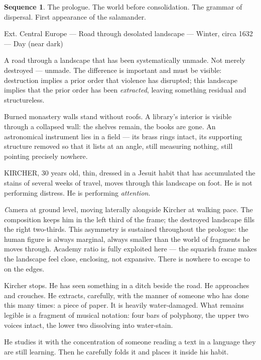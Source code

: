 \documentclass[12pt, a4paper, twoside]{memoir}
\theoremstyle{definition}
\newtheorem{sequence}{Sequence}[chapter]
\theoremstyle{remark}
\newenvironment{sceneheading}{%
  \vspace{8pt}%
  \noindent\begin{mdframed}[
    linecolor=arkgold,
    linewidth=0.8pt,
    leftmargin=0pt,
    rightmargin=0pt,
    innerleftmargin=6pt,
    innerrightmargin=6pt,
    innertopmargin=4pt,
    innerbottommargin=4pt,
    backgroundcolor=arkgold!6
  ]%
  \noindent\textsc\bgroup\small
}{%
  \egroup\end{mdframed}\vspace{4pt}%
}
\newenvironment{action}{%
  \vspace{4pt}%
  \noindent\begin{minipage}{\linewidth}%
  \setlength{\parindent}{0pt}%
  \itshape\color{kircherink}%
}{%
  \end{minipage}\vspace{6pt}%
}
\newenvironment{visual}{%
  \vspace{6pt}%
  \noindent\begin{mdframed}[
    linecolor=plaguegrey,
    linewidth=0.4pt,
    leftline=true, rightline=false, topline=false, bottomline=false,
    innerleftmargin=8pt,
    innerrightmargin=0pt,
    innertopmargin=2pt,
    innerbottommargin=2pt,
    backgroundcolor=white
  ]%
  \footnotesize\color{plaguegrey}\textit
}{%
  \end{mdframed}\vspace{4pt}%
}
\begin{document}
\begin{sequence}
\label{seq:prologue}
The prologue. The world before consolidation. The grammar of dispersal. First appearance of the salamander.
\end{sequence}

\begin{sceneheading}
Ext. Central Europe --- Road through desolated landscape --- Winter, circa 1632 --- Day (near dark)
\end{sceneheading}

\begin{action}
A road through a landscape that has been systematically unmade. Not merely destroyed --- unmade. The difference is important and must be visible: destruction implies a prior order that violence has disrupted; this landscape implies that the prior order has been \textit{extracted}, leaving something residual and structureless.

Burned monastery walls stand without roofs. A library's interior is visible through a collapsed wall: the shelves remain, the books are gone. An astronomical instrument lies in a field --- its brass rings intact, its supporting structure removed so that it lists at an angle, still measuring nothing, still pointing precisely nowhere.

KIRCHER, 30 years old, thin, dressed in a Jesuit habit that has accumulated the stains of several weeks of travel, moves through this landscape on foot. He is not performing distress. He is performing \textit{attention}.
\end{action}

\begin{visual}
Camera at ground level, moving laterally alongside Kircher at walking pace. The composition keeps him in the left third of the frame; the destroyed landscape fills the right two-thirds. This asymmetry is sustained throughout the prologue: the human figure is always marginal, always smaller than the world of fragments he moves through. Academy ratio is fully exploited here --- the squarish frame makes the landscape feel close, enclosing, not expansive. There is nowhere to escape to on the edges.
\end{visual}

\begin{action}
Kircher stops. He has seen something in a ditch beside the road. He approaches and crouches. He extracts, carefully, with the manner of someone who has done this many times: a piece of paper. It is heavily water-damaged. What remains legible is a fragment of musical notation: four bars of polyphony, the upper two voices intact, the lower two dissolving into water-stain.

He studies it with the concentration of someone reading a text in a language they are still learning. Then he carefully folds it and places it inside his habit.
\end{action}
\end{document}
